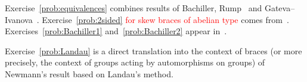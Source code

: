 Exercise~\ref{prob:equivalences} combines results of Bachiller, Rump~\cite{MR2278047} and
Gateva--Ivanova~\cite{MR3861714}. 
Exercise~\ref{prob:2sided}  \textcolor{red}{for skew braces of abelian type} comes from~\cite{MR3177933}. 
Exercises~\ref{prob:Bachiller1} and~\ref{prob:Bachiller2} appear in~\cite{MR3835326}.

Exercise~\ref{prob:Landau} is a direct translation into the context of braces 
(or more precisely, the context of groups acting by automorphisms on groups)   
of Newmann's result based on Landau's method. 

